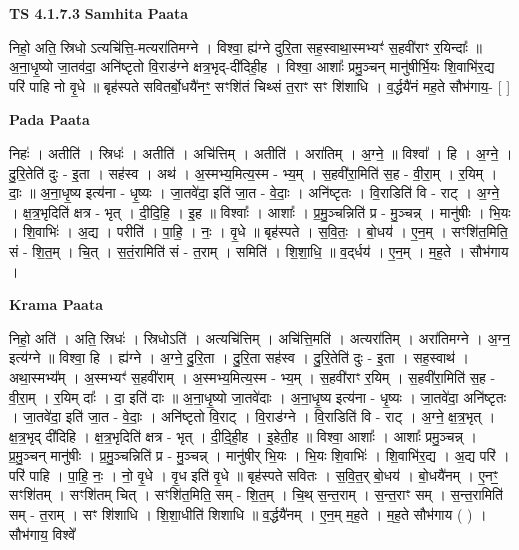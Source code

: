 \documentclass[17pt]{extarticle}
\begin{document}
\textbf{TS 4.1.7.3 } \newline
\textbf{Samhita Paata} \newline

निहो॒ अति॒ स्रिधो ऽत्यचि॑त्ति॒-मत्यरा॑तिमग्ने । विश्वा॒ ह्य॑ग्ने दुरि॒ता सह॒स्वाथा॒स्मभ्यꣳ॑ स॒हवी॑राꣳ र॒यिन्दाः᳚ ॥ अ॒ना॒धृ॒ष्यो जा॒तव॑दा॒ अनि॑ष्टृतो वि॒राड॑ग्ने क्षत्र॒भृद्-दी॑दिही॒ह । विश्वा॒ आशाः᳚ प्रमु॒ञ्चन् मानु॑षीर्भि॒यः शि॒वाभि॑र॒द्य परि॑ पाहि नो वृ॒धे ॥ बृह॑स्पते सवितर्बो॒धयै॑नꣳ॒॒ सꣳशि॑तं चिथ्सं त॒राꣳ सꣳ शि॑शाधि । व॒र्द्धयै॑नं मह॒ते सौभ॑गाय॒- [  ] \newline

\textbf{Pada Paata} \newline

निहः॑ । अतीति॑ । स्रिधः॑ । अतीति॑ । अचि॑त्तिम् । अतीति॑ । अरा॑तिम् । अ॒ग्ने॒ ॥ विश्वा᳚ । हि । अ॒ग्ने॒ । दु॒रि॒तेति॑ दुः - इ॒ता । सह॑स्व । अथ॑ । अ॒स्मभ्य॒मित्य॒स्म - भ्य॒म् । स॒हवी॑रा॒मिति॑ स॒ह - वी॒रा॒म् । र॒यिम् । दाः॒ ॥ अ॒ना॒धृ॒ष्य इत्य॑ना - धृ॒ष्यः । जा॒तवे॑दा॒ इति॑ जा॒त - वे॒दाः॒ । अनि॑ष्टृतः । वि॒राडिति॑ वि - राट् । अ॒ग्ने॒ । क्ष॒त्र॒भृदिति॑ क्षत्र - भृत् । दी॒दि॒हि॒ । इ॒ह ॥ विश्वाः᳚ । आशाः᳚ । प्र॒मु॒ञ्चन्निति॑ प्र - मु॒ञ्चन्न् । मानु॑षीः । भि॒यः । शि॒वाभिः॑ । अ॒द्य । परीति॑ । पा॒हि॒ । नः॒ । वृ॒धे ॥ बृह॑स्पते । स॒वि॒तः॒ । बो॒धय॑ । ए॒न॒म् । सꣳशि॑त॒मिति॒ सं - शि॒त॒म् । चि॒त् । स॒तं॒रामिति॑ सं - त॒राम् । समिति॑ । शि॒शा॒धि॒ ॥ व॒द्‌र्धय॑ । ए॒न॒म् । म॒ह॒ते । सौभ॑गाय ।  \newline


\textbf{Krama Paata} \newline

निहो॒ अति॑ । अति॒ स्रिधः॑ । स्रिधोऽति॑ । अत्यचि॑त्तिम् । अचि॑त्ति॒मति॑ । अत्यरा॑तिम् । अरा॑तिमग्ने । अ॒ग्न॒ इत्य॑ग्ने ॥ विश्वा॒ हि । ह्य॑ग्ने । अ॒ग्ने॒ दु॒रि॒ता । दु॒रि॒ता सह॑स्व । दु॒रि॒तेति॑ दुः - इ॒ता । सह॒स्वाथ॑ । अथा॒स्मभ्य᳚म् । अ॒स्मभ्यꣳ॑ स॒हवी॑राम् । अ॒स्मभ्य॒मित्य॒स्म - भ्य॒म् । स॒हवी॑राꣳ र॒यिम् । स॒हवी॑रा॒मिति॑ स॒ह - वी॒रा॒म् । र॒यिम् दाः᳚ । दा॒ इति॑ दाः ॥ अ॒ना॒धृ॒ष्यो जा॒तवे॑दाः । अ॒ना॒धृ॒ष्य इत्य॑ना - धृ॒ष्यः । जा॒तवे॑दा॒ अनि॑ष्टृतः । जा॒तवे॑दा॒ इति॑ जा॒त - वे॒दाः॒ । अनि॑ष्टृतो वि॒राट् । वि॒राड॑ग्ने । वि॒राडिति॑ वि - राट् । अ॒ग्ने॒ क्ष॒त्र॒भृत् । क्ष॒त्र॒भृद् दी॑दिहि । क्ष॒त्र॒भृदिति॑ क्षत्र - भृत् । दी॒दि॒ही॒ह । इ॒हेती॒ह ॥ विश्वा॒ आशाः᳚ । आशाः᳚ प्रमु॒ञ्चन्न् । प्र॒मु॒ञ्चन् मानु॑षीः । प्र॒मु॒ञ्चन्निति॑ प्र - मु॒ञ्चन्न् । मानु॑षीर् भि॒यः । भि॒यः शि॒वाभिः॑ । शि॒वाभि॑र॒द्य । अ॒द्य परि॑ । परि॑ पाहि । पा॒हि॒ नः॒ । नो॒ वृ॒धे । वृ॒ध इति॑ वृ॒धे ॥ बृह॑स्पते सवितः । स॒वि॒त॒र् बो॒धय॑ । बो॒धयै॑नम् । ए॒नꣳ॒॒ सꣳशि॑तम् । सꣳशि॑तम् चित् । सꣳशि॑त॒मिति॒ सम् - शि॒त॒म् । चि॒थ् स॒न्त॒राम् । स॒न्त॒राꣳ सम् । स॒न्त॒रामिति॑ सम् - त॒राम् । सꣳ शि॑शाधि । शि॒शा॒धीति॑ शिशाधि ॥ व॒र्द्धयै॑नम् । ए॒न॒म् म॒ह॒ते । म॒ह॒ते सौभ॑गाय ( ) । सौभ॑गाय॒ विश्वे᳚ \newline
\end{document}
